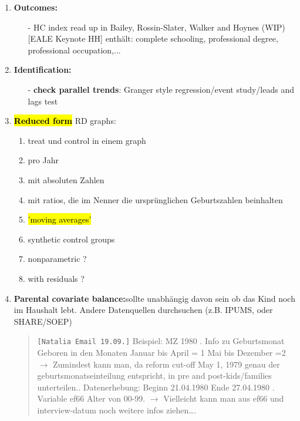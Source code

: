 \documentclass[11pt,a4paper]{article}
\begin{document}
{\begin{enumerate}
\item \textbf{Outcomes: }\vspace{-1em}
\begin{itemize}
	\item[-] HC index \newline read up in Bailey, Rossin-Slater, Walker and Hoynes (WIP) [EALE 	Keynote HH] enthält: complete schooling, professional degree, professional occupation,...
\end{itemize}


\item \textbf{Identification:}\vspace{-1em}
\begin{itemize}
	\item[-]\textbf{check parallel trends}: Granger style regression/event study/leads and lags test
\end{itemize}


\item \textbf{\hl{Reduced form}}\newline 
RD graphs:\vspace{-1em}
\begin{enumerate}
	\item treat und control in einem graph
	\item pro Jahr
	\item mit absoluten Zahlen
	\item mit ratios, die im Nenner die ursprünglichen Geburtszahlen beinhalten
	\item \hl{'moving averages'}
	\item synthetic control groups
	\item nonparametric ? 
	\item with residuals ? 
\end{enumerate}


\item \textbf{Parental covariate balance:}\newline sollte unabhängig davon sein ob das Kind noch im Haushalt lebt. Andere Datenquellen durchsuchen (z.B. IPUMS, oder SHARE/SOEP)
\begin{quote}
	\texttt{[Natalia Email 19.09.]}\newline
	Beispiel: MZ 1980 .	Info zu Geburtsmonat   Geboren in den Monaten
	Januar bis April = 1
	Mai bis Dezember  =2 \newline
	$\rightarrow$	Zumindest kann man, da reform cut-off May 1, 1979 genau der 	geburtsmonatseinteilung entspricht, in pre and post-kids/families unterteilen..	Datenerhebung: 
	Beginn 21.04.1980 
	Ende 27.04.1980 . Variable ef66 Alter von 00-99.\newline
	$\rightarrow$	Vielleicht kann man aus ef66 und interview-datum noch weitere infos ziehen….
\end{quote}



\end{enumerate}}
\end{document}
